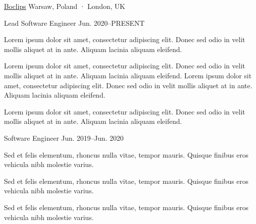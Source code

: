 
\begin{cventries}

  \multicventry
    {\href{https://www.boclips.com}{Boclips}} %
    {Warsaw, Poland · London, UK} %
    {
      \multicventryitem
        {Lead Software Engineer} %
        {Jun. 2020–PRESENT} %
        {
          \begin{cvitems} %
            \item {Lorem ipsum dolor sit amet, consectetur adipiscing elit. Donec sed odio in velit mollis aliquet at in ante. Aliquam lacinia aliquam eleifend.}
            \item {Lorem ipsum dolor sit amet, consectetur adipiscing elit. Donec sed odio in velit mollis aliquet at in ante. Aliquam lacinia aliquam eleifend. Lorem ipsum dolor sit amet, consectetur adipiscing elit. Donec sed odio in velit mollis aliquet at in ante. Aliquam lacinia aliquam eleifend.}
            \item {Lorem ipsum dolor sit amet, consectetur adipiscing elit. Donec sed odio in velit mollis aliquet at in ante. Aliquam lacinia aliquam eleifend.}
          \end{cvitems}
        }
      \multicventryitem
        {Software Engineer} %
        {Jun. 2019–Jun. 2020} %
        {
          \begin{cvitems} %
            \item {Sed et felis elementum, rhoncus nulla vitae, tempor mauris. Quisque finibus eros vehicula nibh molestie varius.}
            \item {Sed et felis elementum, rhoncus nulla vitae, tempor mauris. Quisque finibus eros vehicula nibh molestie varius.}
            \item {Sed et felis elementum, rhoncus nulla vitae, tempor mauris. Quisque finibus eros vehicula nibh molestie varius.}
          \end{cvitems}
        }
    }


\end{cventries}
